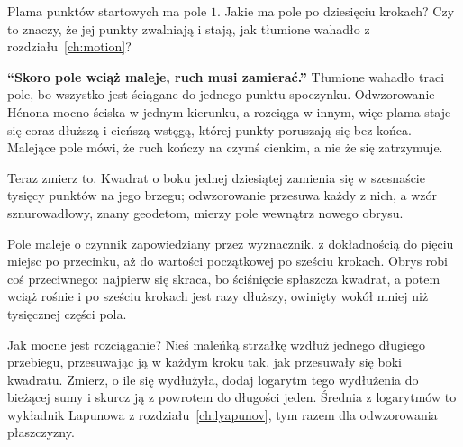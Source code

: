 \begin{think}
Plama punktów startowych ma pole $1$. Jakie ma pole po dziesięciu krokach?
Czy to znaczy, że jej punkty zwalniają i stają, jak tłumione wahadło z
rozdziału~\ref{ch:motion}?
\end{think}

\begin{trapbox}
\textbf{\enquote{Skoro pole wciąż maleje, ruch musi zamierać.}} Tłumione
wahadło traci pole, bo wszystko jest ściągane do jednego punktu spoczynku.
Odwzorowanie Hénona mocno ściska w jednym kierunku, a rozciąga w innym, więc
plama staje się coraz dłuższą i cieńszą wstęgą, której punkty poruszają się
bez końca. Malejące pole mówi, że ruch kończy na czymś cienkim, a nie że się
zatrzymuje.
\end{trapbox}

\noindent
Teraz zmierz to. Kwadrat o boku jednej dziesiątej zamienia się w szesnaście
tysięcy punktów na jego brzegu; odwzorowanie przesuwa każdy z nich, a wzór
sznurowadłowy, znany geodetom, mierzy pole wewnątrz nowego obrysu.



\noindent
Pole maleje o czynnik zapowiedziany przez wyznacznik, z dokładnością do pięciu
miejsc po przecinku, aż do  wartości początkowej po
sześciu krokach. Obrys robi coś przeciwnego: najpierw się skraca, bo
ściśnięcie spłaszcza kwadrat, a potem wciąż rośnie i po sześciu krokach jest
 razy dłuższy, owinięty wokół mniej niż tysięcznej
części pola.


\noindent
Jak mocne jest rozciąganie? Nieś maleńką strzałkę wzdłuż jednego długiego
przebiegu, przesuwając ją w każdym kroku tak, jak przesuwały się boki
kwadratu. Zmierz, o ile się wydłużyła, dodaj logarytm tego wydłużenia do
bieżącej sumy i skurcz ją z powrotem do długości jeden. Średnia z logarytmów
to wykładnik Lapunowa z rozdziału~\ref{ch:lyapunov}, tym razem dla
odwzorowania płaszczyzny.


